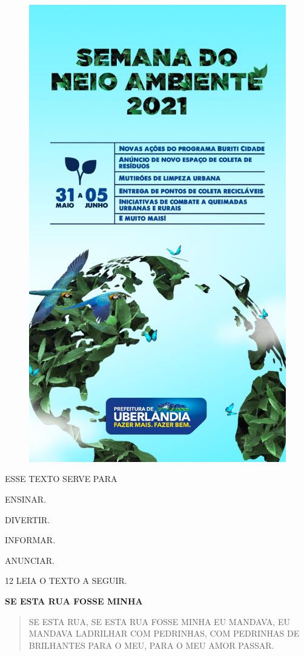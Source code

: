 \begin{figure}[H]
\centering
\includegraphics[width=.6\textwidth]{./media/image218.jpeg}
\end{figure}

ESSE TEXTO SERVE PARA

\begin{escolha}

\item ENSINAR.

\item DIVERTIR.

\item INFORMAR.

\item ANUNCIAR.

\end{escolha}

\pagebreak
\num{12} LEIA O TEXTO A SEGUIR.

\begin{myquote}
\textbf{SE ESTA RUA FOSSE MINHA}

\begin{verse}
SE ESTA RUA, SE ESTA RUA
FOSSE MINHA
EU MANDAVA,
EU MANDAVA LADRILHAR
COM PEDRINHAS,
COM PEDRINHAS DE BRILHANTES
PARA O MEU,
PARA O MEU AMOR PASSAR.
\end{verse}

\end{myquote}

